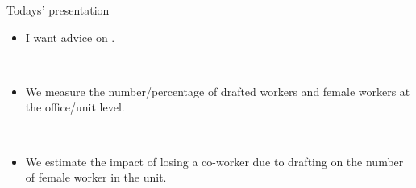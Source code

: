 \begin{frame}{Todays' presentation}
    \begin{itemize}
        \item I want advice on .

        \
        
        \item We measure the number/percentage of drafted workers and female workers at the office/unit level.

        \

        \item We estimate the impact of losing a co-worker due to drafting on the number of female worker in the unit.

    \end{itemize}
\end{frame}